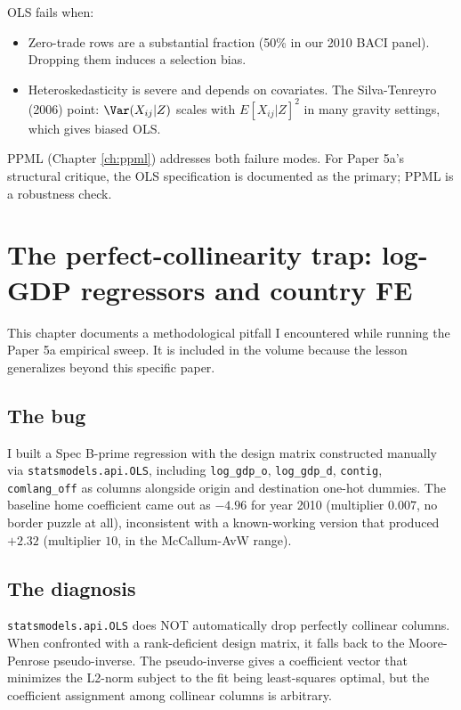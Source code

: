 \documentclass[11pt,letterpaper,oneside]{book}
\theoremstyle{definition}
\theoremstyle{remark}
\begin{document}
OLS fails when:
\begin{itemize}
  \item Zero-trade rows are a substantial fraction (50\% in our 2010
    BACI panel). Dropping them induces a selection bias.
  \item Heteroskedasticity is severe and depends on covariates. The
    Silva-Tenreyro (2006) point: $\Var(X_{ij}|Z)$ scales with
    $E[X_{ij}|Z]^2$ in many gravity settings, which gives biased OLS.
\end{itemize}

PPML (Chapter \ref{ch:ppml}) addresses both failure modes. For Paper 5a's
structural critique, the OLS specification is documented as the
primary; PPML is a robustness check.

\chapter{The perfect-collinearity trap: log-GDP regressors and country FE}

\label{ch:collinearity-trap}

This chapter documents a methodological pitfall I encountered while
running the Paper 5a empirical sweep. It is included in the volume
because the lesson generalizes beyond this specific paper.

\section{The bug}

I built a Spec B-prime regression with the design matrix constructed
manually via \texttt{statsmodels.api.OLS}, including
\texttt{log\_gdp\_o}, \texttt{log\_gdp\_d}, \texttt{contig},
\texttt{comlang\_off} as columns alongside origin and destination
one-hot dummies. The baseline home coefficient came out as $-4.96$ for
year 2010 (multiplier $0.007$, no border puzzle at all), inconsistent
with a known-working version that produced $+2.32$ (multiplier $10$, in
the McCallum-AvW range).

\section{The diagnosis}

\texttt{statsmodels.api.OLS} does NOT automatically drop perfectly
collinear columns. When confronted with a rank-deficient design matrix,
it falls back to the Moore-Penrose pseudo-inverse. The pseudo-inverse
gives a coefficient vector that minimizes the L2-norm subject to the
fit being least-squares optimal, but the coefficient assignment among
collinear columns is arbitrary.
\end{document}
